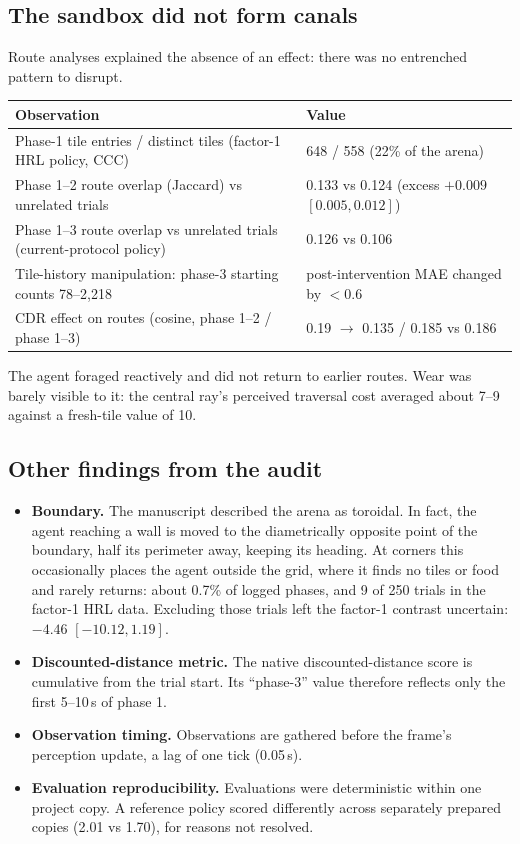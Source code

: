\documentclass[11pt]{article}
\begin{document}
\subsection{The sandbox did not form canals}

Route analyses explained the absence of an effect: there was no entrenched pattern to disrupt.

\begin{table}[H]
\centering\small
\begin{tabularx}{\linewidth}{@{}YY@{}}
\toprule
Observation & Value\\
\midrule
Phase-1 tile entries / distinct tiles (factor-1 HRL policy, CCC) & 648 / 558 (22\% of the arena)\\
Phase 1--2 route overlap (Jaccard) vs unrelated trials & 0.133 vs 0.124 (excess $+0.009$ $[0.005, 0.012]$)\\
Phase 1--3 route overlap vs unrelated trials (current-protocol policy) & 0.126 vs 0.106\\
Tile-history manipulation: phase-3 starting counts 78--2,218 & post-intervention MAE changed by $<0.6$\\
CDR effect on routes (cosine, phase 1--2 / phase 1--3) & 0.19 $\to$ 0.135 / 0.185 vs 0.186\\
\bottomrule
\end{tabularx}
\end{table}

The agent foraged reactively and did not return to earlier routes. Wear was barely visible to it: the central ray's perceived traversal cost averaged about 7--9 against a fresh-tile value of 10.

\subsection{Other findings from the audit}

\begin{itemize}
  \item \textbf{Boundary.} The manuscript described the arena as toroidal. In fact, the agent reaching a wall is moved to the diametrically opposite point of the boundary, half its perimeter away, keeping its heading. At corners this occasionally places the agent outside the grid, where it finds no tiles or food and rarely returns: about 0.7\% of logged phases, and 9 of 250 trials in the factor-1 HRL data. Excluding those trials left the factor-1 contrast uncertain: $-4.46$ $[-10.12, 1.19]$.
  \item \textbf{Discounted-distance metric.} The native discounted-distance score is cumulative from the trial start. Its ``phase-3'' value therefore reflects only the first 5--10\,s of phase 1.
  \item \textbf{Observation timing.} Observations are gathered before the frame's perception update, a lag of one tick (0.05\,s).
  \item \textbf{Evaluation reproducibility.} Evaluations were deterministic within one project copy. A reference policy scored differently across separately prepared copies (2.01 vs 1.70), for reasons not resolved.
\end{itemize}
\end{document}
